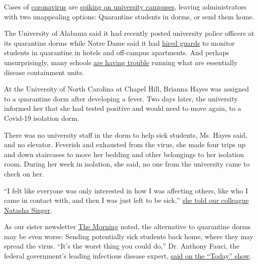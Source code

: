 Cases of
\href{https://www.nytimes3xbfgragh.onion/2020/09/09/us/schools-reopening-coronavirus.html}{coronavirus}
are
\href{https://www.nytimes3xbfgragh.onion/2020/09/06/us/colleges-coronavirus-students.html}{spiking
on university campuses}, leaving administrators with two unappealing
options: Quarantine students in dorms, or send them home.

The University of Alabama said it had recently posted university police
officers at its quarantine dorms while Notre Dame said it had
\href{https://www.southbendtribune.com/news/education/notre-dame-hires-more-security-after-students-placed-in-quarantine-violate-rules/article_a9c04f36-e70a-11ea-a52e-e74b0cf9b0f3.html?utm_source=Iterable\&utm_medium=email\&utm_campaign=campaign_1481931_nl_Daily-Briefing_date_20200831\&cid=db\&source=ams\&sourceId=5289649}{hired
guards} to monitor students in quarantine in hotels and off-campus
apartments. And perhaps unsurprisingly, many schools
\href{https://www.nytimes3xbfgragh.onion/2020/08/22/nyregion/coronavirus-tiktok-college-quarantine-food.html}{are
having trouble} running what are essentially disease containment units.

At the University of North Carolina at Chapel Hill, Brianna Hayes was
assigned to a quarantine dorm after developing a fever. Two days later,
the university informed her that she had tested positive and would need
to move again, to a Covid-19 isolation dorm.

There was no university staff in the dorm to help sick students, Ms.
Hayes said, and no elevator. Feverish and exhausted from the virus, she
made four trips up and down staircases to move her bedding and other
belongings to her isolation room. During her week in isolation, she
said, no one from the university came to check on her.

``I felt like everyone was only interested in how I was affecting
others, like who I came in contact with, and then I was just left to be
sick,''
\href{https://www.nytimes3xbfgragh.onion/2020/09/09/business/colleges-coronavirus-dormitories-quarantine.html}{she
told our colleague Natasha Singer}.

As our sister newsletter
\href{https://www.nytimes3xbfgragh.onion/2020/09/09/briefing/astrazeneca-california-wildfires-justice-department-your-wednesday-briefing.html}{The
Morning} noted, the alternative to quarantine dorms may be even worse:
Sending potentially sick students back home, where they may spread the
virus. ``It's the worst thing you could do,'' Dr. Anthony Fauci, the
federal government's leading infectious disease expert,
\href{https://www.today.com/video/dr-anthony-fauci-predicts-safe-and-effective-vaccine-by-end-of-2020-91005509862}{said
on the ``Today'' show}.

